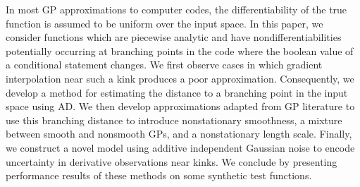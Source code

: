 \documentclass{article}
\numberwithin{equation}{section}
\begin{document}
In most GP approximations to computer codes, the differentiability of the true function is assumed to be uniform over the input space. In this paper, we consider functions which are piecewise analytic and have nondifferentiabilities potentially occurring at branching points in the code where the boolean value of a conditional statement changes. We first observe cases in which gradient interpolation near such a kink produces a poor approximation. Consequently, we develop a method for estimating the distance to a branching point in the input space using AD. We then develop approximations adapted from GP literature to use this branching distance to introduce nonstationary smoothness, a mixture between smooth and nonsmooth GPs, and a nonstationary length scale. Finally, we construct a novel model using additive independent Gaussian noise to encode uncertainty in derivative observations near kinks. We conclude by presenting performance results of these methods on some synthetic test functions.
\end{document}
